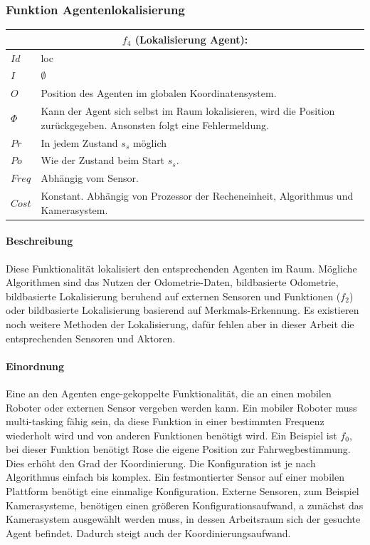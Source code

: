 \subsubsection{Funktion Agentenlokalisierung}
\label{sec:funl}
\begin{tabular}{|p{3cm}|p{10cm}|}
	\multicolumn{2}{c}{$f_4$ (Lokalisierung Agent):}\\
	\hline  $Id$ & loc\\ 
	\hline  $I$ & $\emptyset$ \\ 
	\hline  $O$ & Position des Agenten im globalen Koordinatensystem. \\ 
	\hline  $\Phi$ & Kann der Agent sich selbst im Raum lokalisieren, wird die Position zurückgegeben. Ansonsten folgt eine Fehlermeldung.\\ 
	\hline $Pr$ & In jedem Zustand $s_s$ möglich \\ 
	\hline $Po$ & Wie der Zustand beim Start $s_s$.\\ 
	\hline $Freq$ & Abhängig vom Sensor.\\ 
	\hline $Cost$ & Konstant. Abhängig von Prozessor der Recheneinheit, Algorithmus und Kamerasystem. \\
	\hline
\end{tabular} 

\paragraph{Beschreibung}
Diese Funktionalität lokalisiert den entsprechenden Agenten im Raum. Mögliche Algorithmen sind das Nutzen der Odometrie-Daten, bildbasierte Odometrie, bildbasierte Lokalisierung beruhend auf externen Sensoren und Funktionen ($f_2$) oder bildbasierte Lokalisierung basierend auf Merkmals-Erkennung. Es existieren noch weitere Methoden der Lokalisierung, dafür fehlen aber in dieser Arbeit die entsprechenden Sensoren und Aktoren.

\paragraph{Einordnung}
Eine an den Agenten enge-gekoppelte Funktionalität, die an einen mobilen Roboter oder externen Sensor vergeben werden kann. Ein mobiler Roboter muss multi-tasking fähig sein, da diese Funktion in einer bestimmten Frequenz wiederholt wird und von anderen Funktionen benötigt wird. Ein Beispiel ist $f_0$, bei dieser Funktion benötigt Rose die eigene Position zur Fahrwegbestimmung. Dies erhöht den Grad der Koordinierung. Die Konfiguration ist je nach Algorithmus einfach bis komplex. Ein festmontierter Sensor auf einer mobilen Plattform benötigt eine einmalige Konfiguration. Externe Sensoren, zum Beispiel Kamerasysteme, benötigen einen größeren Konfigurationsaufwand, a zunächst das Kamerasystem ausgewählt werden muss, in dessen Arbeitsraum sich der gesuchte Agent befindet. Dadurch steigt auch der Koordinierungsaufwand.

